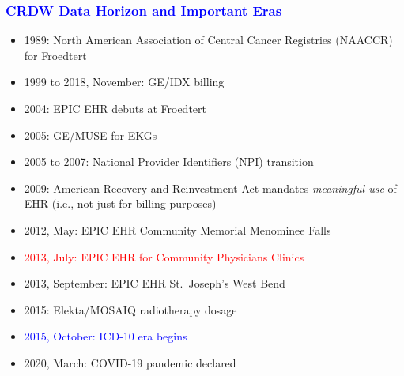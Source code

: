 \documentclass[11pt,pdftex,dvipsnames,usenames]{beamer}
\begin{document}
\begin{frame}[fragile]\frametitle{\bf\textcolor{blue}{CRDW Data Horizon
and Important Eras}}

\begin{itemize}
\item 1989: North American Association of Central Cancer Registries
  (NAACCR) for Froedtert %
\item 1999 to 2018, November: GE/IDX billing
\item 2004: EPIC EHR debuts at Froedtert
\item 2005: GE/MUSE for EKGs
\item 2005 to 2007: National Provider Identifiers (NPI) transition
\item 2009: American Recovery and Reinvestment Act mandates {\it meaningful use} of EHR (i.e., not just for billing purposes)
\item 2012, May: EPIC EHR Community Memorial Menominee Falls
\item \textcolor{red}{2013, July: EPIC EHR for Community Physicians Clinics} 
\item 2013, September: EPIC EHR St.\ Joseph's West Bend
\item 2015: Elekta/MOSAIQ radiotherapy dosage
\item \textcolor{blue}{2015, October: ICD-10 era begins}
\item 2020, March: COVID-19 pandemic declared
\end{itemize}

\end{frame}
\end{document}
